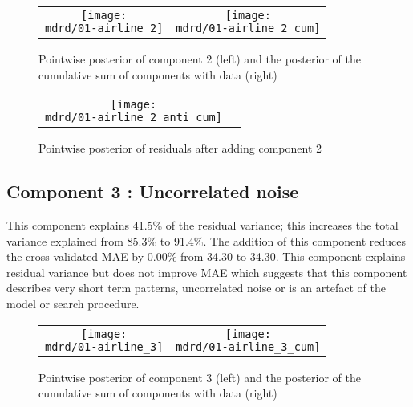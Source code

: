 \documentclass{article} %
\begin{document}
\begin{figure}[H]
\newcommand{\wmgd}{0.5\columnwidth}
\newcommand{\hmgd}{3.0cm}
\newcommand{\mdrd}{01-airline}
\newcommand{\mbm}{\hspace{-0.3cm}}
\begin{tabular}{cc}
\mbm \texttt{[image: \\mdrd/01-airline\_2]} & \texttt{[image: \\mdrd/01-airline\_2\_cum]}
\end{tabular}
\caption{Pointwise posterior of component 2 (left) and the posterior of the cumulative sum of components with data (right)}
\label{fig:comp2}
\end{figure}

\begin{figure}[H]
\newcommand{\wmgd}{0.5\columnwidth}
\newcommand{\hmgd}{3.0cm}
\newcommand{\mdrd}{01-airline}
\newcommand{\mbm}{\hspace{-0.3cm}}
\begin{tabular}{cc}
\mbm \texttt{[image: \\mdrd/01-airline\_2\_anti\_cum]}
\end{tabular}
\caption{Pointwise posterior of residuals after adding component 2}
\label{fig:comp2}
\end{figure}

\subsection{Component 3 : Uncorrelated noise}



This component explains 41.5\% of the residual variance; this increases the total variance explained from 85.3\% to 91.4\%.
The addition of this component reduces the cross validated MAE by 0.00\% from 34.30 to 34.30.
This component explains residual variance but does not improve MAE which suggests that this component describes very short term patterns, uncorrelated noise or is an artefact of the model or search procedure.

\begin{figure}[H]
\newcommand{\wmgd}{0.5\columnwidth}
\newcommand{\hmgd}{3.0cm}
\newcommand{\mdrd}{01-airline}
\newcommand{\mbm}{\hspace{-0.3cm}}
\begin{tabular}{cc}
\mbm \texttt{[image: \\mdrd/01-airline\_3]} & \texttt{[image: \\mdrd/01-airline\_3\_cum]}
\end{tabular}
\caption{Pointwise posterior of component 3 (left) and the posterior of the cumulative sum of components with data (right)}
\label{fig:comp3}
\end{figure}
\end{document}
